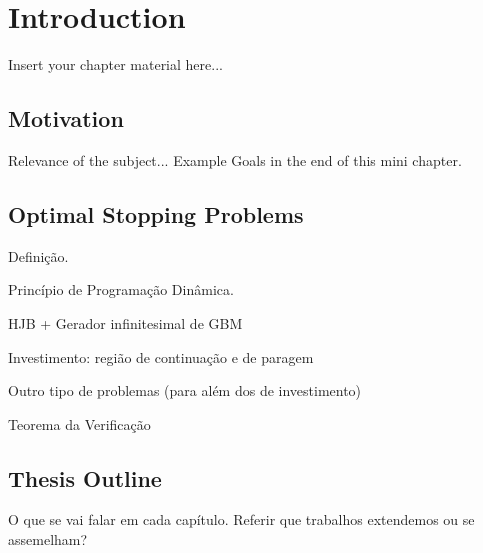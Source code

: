 
\chapter{Introduction}
\label{chapter:introduction}

Insert your chapter material here...

\section{Motivation}
\label{section:motivation}

Relevance of the subject...
Example
Goals in the end of this mini chapter.

\section{Optimal Stopping Problems}
\label{section:osp}

Definição.

Princípio de Programação Dinâmica.

HJB + Gerador infinitesimal de GBM

Investimento: região de continuação e de paragem

Outro tipo de problemas (para além dos de investimento)

Teorema da Verificação



\section{Thesis Outline}
\label{section:outline}

O que se vai falar em cada capítulo.
Referir que trabalhos extendemos ou se assemelham?

